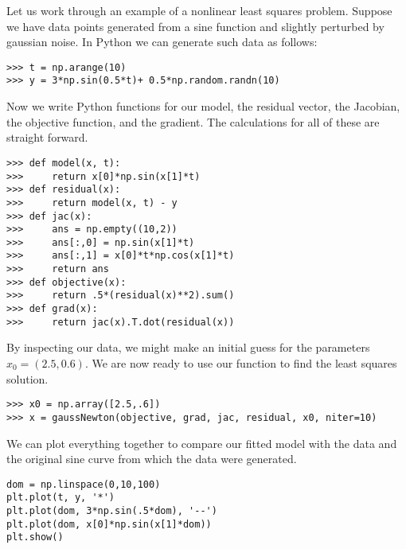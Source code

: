 Let us work through an example of a nonlinear least squares problem. Suppose we have data points
generated from a sine function and slightly perturbed by gaussian noise. In Python we can generate such
data as follows:
\begin{lstlisting}
>>> t = np.arange(10)
>>> y = 3*np.sin(0.5*t)+ 0.5*np.random.randn(10)
\end{lstlisting}
Now we write Python functions for our model, the residual vector, the Jacobian, the objective function,
and the gradient. The calculations for all of these are straight forward.
\begin{lstlisting}
>>> def model(x, t):
>>>     return x[0]*np.sin(x[1]*t)
>>> def residual(x):
>>>     return model(x, t) - y
>>> def jac(x):
>>>     ans = np.empty((10,2))
>>>     ans[:,0] = np.sin(x[1]*t)
>>>     ans[:,1] = x[0]*t*np.cos(x[1]*t)
>>>     return ans
>>> def objective(x):
>>>     return .5*(residual(x)**2).sum()
>>> def grad(x):
>>>     return jac(x).T.dot(residual(x))
\end{lstlisting}
By inspecting our data, we might make an initial guess for the parameters $x_0 = (2.5, 0.6)$.
We are now ready to use our  function to find the least squares solution.
\begin{lstlisting}
>>> x0 = np.array([2.5,.6])
>>> x = gaussNewton(objective, grad, jac, residual, x0, niter=10)
\end{lstlisting}
We can plot everything together to compare our fitted model with the data and the original sine
curve from which the data were generated.
\begin{lstlisting}
dom = np.linspace(0,10,100)
plt.plot(t, y, '*')
plt.plot(dom, 3*np.sin(.5*dom), '--')
plt.plot(dom, x[0]*np.sin(x[1]*dom))
plt.show()
\end{lstlisting}

